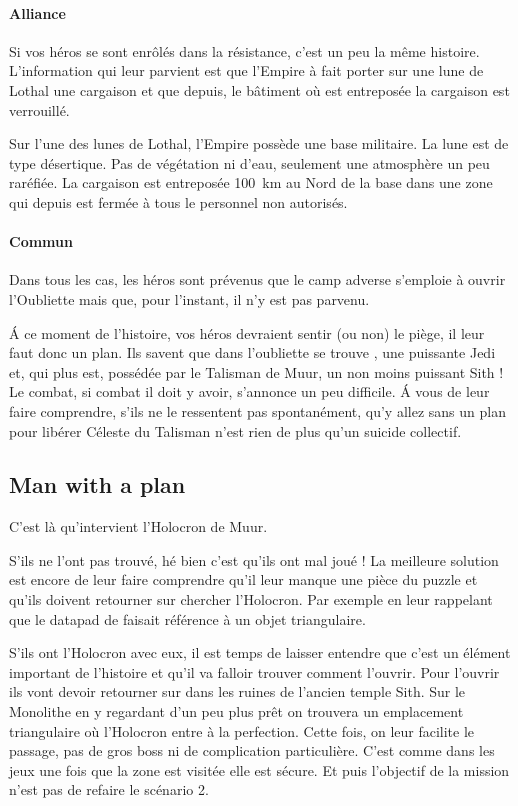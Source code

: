 \paragraph{Alliance}
Si vos héros se sont enrôlés dans la résistance, c’est un peu la même histoire. L’information qui leur parvient est que l’Empire à fait porter sur une lune de Lothal une cargaison et que depuis, le bâtiment où est entreposée la cargaison est verrouillé. 

Sur l’une des lunes de Lothal, l’Empire possède une base militaire. La lune est de type désertique. Pas de végétation ni d’eau, seulement une atmosphère un peu raréfiée. La cargaison est entreposée 100~km au Nord de la base dans une zone qui depuis est fermée à tous le personnel non autorisés.

\paragraph{Commun}
Dans tous les cas, les héros sont prévenus que le camp adverse s’emploie à ouvrir l’Oubliette mais que, pour l’instant, il n’y est pas parvenu.

\'A ce moment de l’histoire, vos héros devraient sentir (ou non) le piège, il leur faut donc un plan. Ils savent que dans l’oubliette se trouve , une puissante Jedi et, qui plus est, possédée par le Talisman de Muur, un non moins puissant Sith ! Le combat, si combat il doit y avoir, s’annonce un peu difficile. \'A vous de leur faire comprendre, s’ils ne le ressentent pas spontanément, qu’y allez sans un plan pour libérer Céleste du Talisman n’est rien de plus qu’un suicide collectif.

\subsection{Man with a plan}
C’est là qu’intervient l’Holocron de Muur.

S’ils ne l’ont pas trouvé, hé bien c’est qu’ils ont mal joué ! La meilleure solution est encore de leur faire comprendre qu’il leur manque une pièce du puzzle et qu’ils doivent retourner sur  chercher l’Holocron. Par exemple en leur rappelant que le datapad de  faisait référence à un objet triangulaire.

S’ils ont l’Holocron avec eux, il est temps de laisser entendre que c’est un élément important de l’histoire et qu’il va falloir trouver comment l’ouvrir. Pour l’ouvrir ils vont devoir retourner sur  dans les ruines de l’ancien temple Sith. Sur le Monolithe en y regardant d’un peu plus prêt on trouvera un emplacement triangulaire où l’Holocron entre à la perfection. Cette fois, on leur facilite le passage, pas de gros boss ni de complication particulière. C’est comme dans les jeux une fois que la zone est visitée elle est sécure. Et puis l’objectif de la mission n’est pas de refaire le scénario 2.

